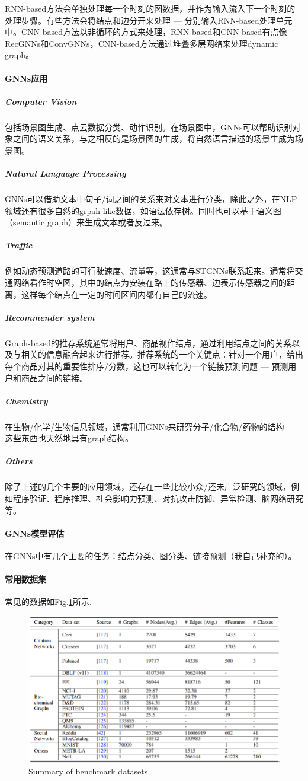 RNN-based方法会单独处理每一个时刻的图数据，并作为输入流入下一个时刻的处理步骤。有些方法会将结点和边分开来处理 --- 分别输入RNN-based处理单元中。CNN-based方法以非循环的方式来处理，RNN-based和CNN-based有点像RecGNNs和ConvGNNs，CNN-based方法通过堆叠多层网络来处理dynamic graph。

\paragraph{GNNs应用}
\subparagraph{Computer Vision}
包括场景图生成、点云数据分类、动作识别。在场景图中，GNNs可以帮助识别对象之间的语义关系，与之相反的是场景图的生成，将自然语言描述的场景生成为场景图。

\subparagraph{Natural Language Processing}
GNNs可以借助文本中句子/词之间的关系来对文本进行分类，除此之外，在NLP领域还有很多自然的grpah-like数据，如语法依存树。同时也可以基于语义图（semantic graph）来生成文本或者反过来。

\subparagraph{Traffic}
例如动态预测道路的可行驶速度、流量等，这通常与STGNNs联系起来。通常将交通网络看作时空图，其中的结点为安装在路上的传感器、边表示传感器之间的距离，这样每个结点在一定的时间区间内都有自己的流速。

\subparagraph{Recommender system}
Graph-based的推荐系统通常将用户、商品视作结点，通过利用结点之间的关系以及与相关的信息融合起来进行推荐。推荐系统的一个关键点：针对一个用户，给出每个商品对其的重要性排序/分数，这也可以转化为一个链接预测问题 --- 预测用户和商品之间的链接。

\subparagraph{Chemistry}
在生物/化学/生物信息领域，通常利用GNNs来研究分子/化合物/药物的结构 --- 这些东西也天然地具有graph结构。

\subparagraph{Others}
除了上述的几个主要的应用领域，还存在一些比较小众/还未广泛研究的领域，例如程序验证、程序推理、社会影响力预测、对抗攻击防御、异常检测、脑网络研究等。

\paragraph{GNNs模型评估}
在GNNs中有几个主要的任务：结点分类、图分类、链接预测（我自己补充的）。

\paragraph{常用数据集}
常见的数据如Fig.\ref{fig:benchmark}所示.
\begin{figure}[h]
	\centering
	\includegraphics[width=.8\textwidth]{pics/benchmark_datasets.png}
	\caption{Summary of benchmark datasets}
	\label{fig:benchmark}
\end{figure}

